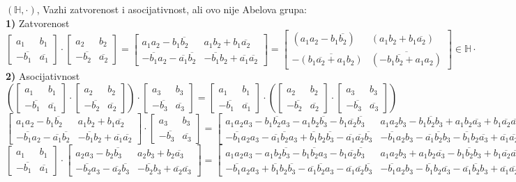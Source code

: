 \documentclass[11pt]{article}
\newcommand\eng{\fontencoding{OT1}\fontfamily{\rmdefault}\selectfont}
\newcommand{\bm}{\begin{bmatrix}}
\newcommand{\enm}{\end{bmatrix}}
\newcommand{\ov}{\overline}
\begin{document}
\large\textbf{\eng{III}} $(\mathbb{H},\cdot)$, Vazhi zatvorenost i asocijativnost, ali ovo nije Abelova grupa:\\

\textbf{1)} Zatvorenost\\
$\bm a_1&b_1\\-\ov{b_1}&\ov{a_1}\enm \cdot \bm a_2&b_2\\-\ov{b_2}&\ov{a_2}\enm = \bm a_1a_2-b_1\ov{b_2}&a_1b_2+b_1\ov{a_2}\\ -\ov{b_1}a_2-\ov{a_1}\ov{b_2}&-\ov{b_1}b_2+\ov{a_1}\ov{a_2} \enm= \bm (a_1a_2-b_1\ov{b_2})&(a_1b_2+b_1\ov{a_2})\\ -\ov{(b_1\ov{a_2}+a_1b_2)}&\ov{(-b_1\ov{b_2}+a_1a_2)} \enm\in\mathbb{H}\cdot$\\
\textbf{2)} Asocijativnost\\
\small$\left(\bm a_1&b_1\\-\ov{b_1}&\ov{a_1}\enm \cdot\bm a_2&b_2\\-\ov{b_2}&\ov{a_2}\enm\right ) \cdot \bm a_3&b_3\\-\ov{b_3}&\ov{a_3}\enm=\bm a_1&b_1\\-\ov{b_1}&\ov{a_1}\enm \cdot\left(\bm a_2&b_2\\-\ov{b_2}&\ov{a_2}\enm \cdot \bm a_3&b_3\\-\ov{b_3}&\ov{a_3}\enm\right)$\\
$\bm a_1a_2-b_1\ov{b_2}&a_1b_2+b_1\ov{a_2}\\-\ov{b_1}a_2-\ov{a_1}\ov{b_2}&-\ov{b_1}b_2+\ov{a_1}\ov{a_2} \enm\cdot \bm a_3&b_3\\-\ov{b_3}&\ov{a_3}\enm = \bm a_1a_2a_3-b_1\ov{b_2}a_3-a_1b_2\ov{b_3}-b_1\ov{a_2}\ov{b_3}&a_1a_2b_3-b_1\ov{b_2}b_3+a_1b_2\ov{a_3}+b_1\ov{a_2}\ov{a_3}\\-\ov{b_1}a_2a_3-\ov{a_1}\ov{b_2}a_3+\ov{b_1}b_2\ov{b_3}-\ov{a_1}\ov{a_2}\ov{b_3}&-\ov{b_1}a_2b_3-\ov{a_1}\ov{b_2}b_3-\ov{b_1}b_2\ov{a_3}+\ov{a_1}\ov{a_2}\ov{a_3} \enm$\\
$\bm a_1&b_1\\-\ov{b_1}&\ov{a_1}\enm\cdot \bm a_2a_3-b_2\ov{b_3}&a_2b_3+b_2\ov{a_3}\\ -\ov{b_2}a_3-\ov{a_2}\ov{b_3}&-\ov{b_2}b_3+\ov{a_2}\ov{a_3} \enm = \bm a_1a_2a_3 - a_1b_2\ov{b_3}-b_1\ov{b_2}a_3-b_1\ov{a_2}\ov{b_3}&a_1a_2b_3+a_1b_2\ov{a_3}-b_1\ov{b_2}b_3+b_1\ov{a_2}\ov{a_3}\\-\ov{b_1}a_2a_3+\ov{b_1}b_2\ov{b_3}-\ov{a_1}\ov{b_2}a_3-\ov{a_1}\ov{a_2}\ov{b_3} &-\ov{b_1}a_2b_3-\ov{b_1}b_2\ov{a_3}-\ov{a_1}\ov{b_2}b_3+\ov{a_1}\ov{a_2}\ov{a_3} \enm$\\
\end{document}
